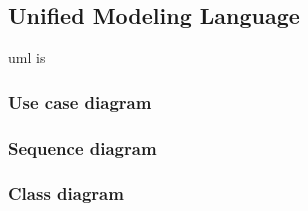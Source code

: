 \subsection{Unified Modeling Language}

\acrfull{uml} is 







\subsubsection{Use case diagram}

\subsubsection{Sequence diagram}

\subsubsection{Class diagram}

